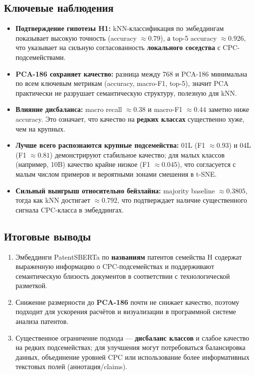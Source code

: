 \documentclass{article}
\begin{document}
\subsection{Ключевые наблюдения}
\begin{itemize}
  \item \textbf{Подтверждение гипотезы H1:} kNN-классификация по эмбеддингам показывает высокую точность (accuracy $\approx 0.79$), а top-5 accuracy $\approx 0.926$, что указывает на сильную согласованность \textbf{локального соседства} с CPC-подсемействами.
  \item \textbf{PCA-186 сохраняет качество:} разница между 768 и PCA-186 минимальна по всем ключевым метрикам (accuracy, macro-F1, top-5), значит PCA практически не разрушает семантическую структуру, полезную для kNN.
  \item \textbf{Влияние дисбаланса:} macro recall $\approx 0.38$ и macro-F1 $\approx 0.44$ заметно ниже accuracy. Это означает, что качество на \textbf{редких классах} существенно хуже, чем на крупных.
  \item \textbf{Лучше всего распознаются крупные подсемейства:} 01L (F1 $\approx 0.93$) и 04L (F1 $\approx 0.81$) демонстрируют стабильное качество; для малых классов (например, 10B) качество крайне низкое (F1 $\approx 0.045$), что согласуется с малым числом примеров и вероятными зонами смешения в t-SNE.
  \item \textbf{Сильный выигрыш относительно бейзлайна:} majority baseline $\approx 0.3805$, тогда как kNN достигает $\approx 0.792$, что подтверждает наличие существенного сигнала CPC-класса в эмбеддингах.
\end{itemize}

\subsection{Итоговые выводы}
\begin{enumerate}
  \item Эмбеддинги PatentSBERTa по \textbf{названиям} патентов семейства H содержат выраженную информацию о CPC-подсемействах и поддерживают семантическую близость документов в соответствии с технологической разметкой.
  \item Снижение размерности до \textbf{PCA-186} почти не снижает качество, поэтому подходит для ускорения расчётов и визуализации в программной системе анализа патентов.
  \item Существенное ограничение подхода --- \textbf{дисбаланс классов} и слабое качество на редких подсемействах; для улучшения могут потребоваться балансировка данных, объединение уровней CPC или использование более информативных текстовых полей (аннотация/claims).
\end{enumerate}
\end{document}
